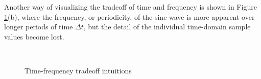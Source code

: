 \documentclass[report.tex]{subfiles}
\begin{document}
Another way of visualizing the tradeoff of time and frequency is shown in Figure \ref{fig:gaborfirst}(b), where the frequency, or periodicity, of the sine wave is more apparent over longer periods of time $\Delta t$, but the detail of the individual time-domain sample values become lost.

\begin{figure}[ht]
	\centering
	\\
	\caption{Time-frequency tradeoff intuitions \parencite[103, 106]{gabor2}}
	\label{fig:gaborfirst}
\end{figure}
\end{document}
